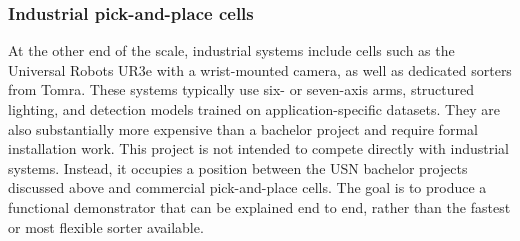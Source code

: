 \subsubsection*{Industrial pick-and-place cells}
At the other end of the scale, industrial systems include cells such as
the Universal Robots UR3e with a wrist-mounted camera, as well as
dedicated sorters from Tomra. These systems typically use six- or
seven-axis arms, structured lighting, and detection models trained on
application-specific datasets. They are also substantially more
expensive than a bachelor project and require formal installation work.
This project is not intended to compete directly with industrial
systems. Instead, it occupies a position between the USN bachelor
projects discussed above and commercial pick-and-place cells. The goal
is to produce a functional demonstrator that can be explained end to
end, rather than the fastest or most flexible sorter available.
